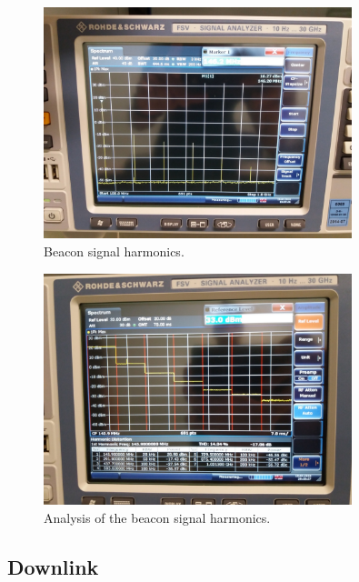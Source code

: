 \documentclass[12pt]{book}
\begin{document}
\begin{figure}[H]
    \begin{center}
        \includegraphics[width=0.8\textwidth]{figures/tests/beacon_harmonics.jpg}
        \caption{Beacon signal harmonics.}
        \label{fig:beacon-harmonics}
    \end{center}
\end{figure}

\begin{figure}[H]
    \begin{center}
        \includegraphics[width=0.8\textwidth]{figures/tests/beacon_harmonics_analysis.jpg}
        \caption{Analysis of the beacon signal harmonics.}
        \label{fig:beacon-harmonics-analysis}
    \end{center}
\end{figure}

\subsection{Downlink}
\end{document}
